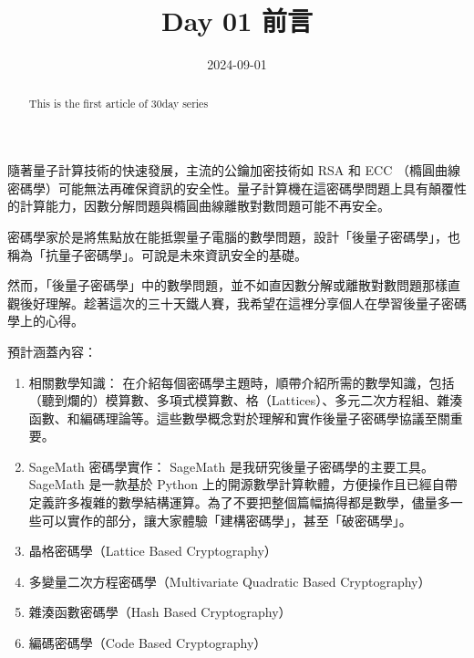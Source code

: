 \documentclass[
]{article}
\title{Day 01 前言}
\author{}
\date{2024-09-01}
\providecommand{\tightlist}{%
  \setlength{\itemsep}{0pt}\setlength{\parskip}{0pt}}
\begin{document}
\maketitle
\begin{abstract}
This is the first article of 30day series
\end{abstract}

隨著量子計算技術的快速發展，主流的公鑰加密技術如 RSA 和 ECC
（橢圓曲線密碼學）可能無法再確保資訊的安全性。量子計算機在這密碼學問題上具有顛覆性的計算能力，因數分解問題與橢圓曲線離散對數問題可能不再安全。

密碼學家於是將焦點放在能抵禦量子電腦的數學問題，設計「後量子密碼學」，也稱為「抗量子密碼學」。可說是未來資訊安全的基礎。

然而，「後量子密碼學」中的數學問題，並不如直因數分解或離散對數問題那樣直觀後好理解。趁著這次的三十天鐵人賽，我希望在這裡分享個人在學習後量子密碼學上的心得。

預計涵蓋內容：

\begin{enumerate}
\def\labelenumi{\arabic{enumi}.}
\tightlist
\item
  相關數學知識：
  在介紹每個密碼學主題時，順帶介紹所需的數學知識，包括（聽到爛的）模算數、多項式模算數、格（Lattices）、多元二次方程組、雜湊函數、和編碼理論等。這些數學概念對於理解和實作後量子密碼學協議至關重要。
\item
  SageMath 密碼學實作： SageMath
  是我研究後量子密碼學的主要工具。SageMath 是一款基於 Python
  上的開源數學計算軟體，方便操作且已經自帶定義許多複雜的數學結構運算。為了不要把整個篇幅搞得都是數學，儘量多一些可以實作的部分，讓大家體驗「建構密碼學」，甚至「破密碼學」。
\item
  晶格密碼學（Lattice Based Cryptography）
\item
  多變量二次方程密碼學（Multivariate Quadratic Based Cryptography）
\item
  雜湊函數密碼學（Hash Based Cryptography）
\item
  編碼密碼學（Code Based Cryptography）
\end{enumerate}
\end{document}
